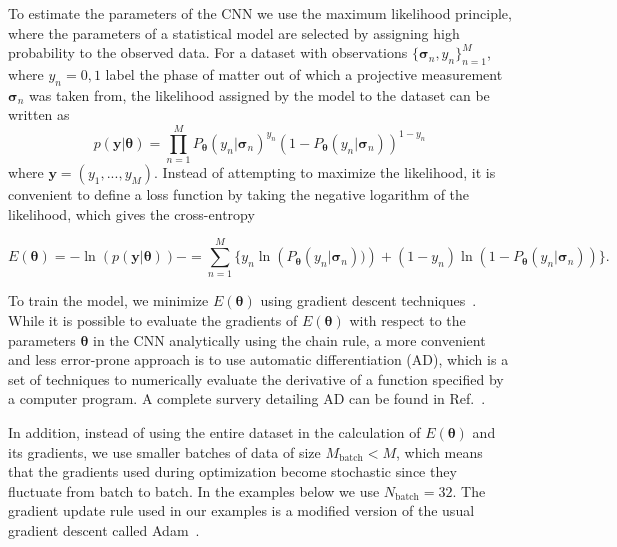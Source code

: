 \documentclass[twocolumn,english,reprint,superscriptaddress,longbibliography,pra]{revtex4-1}
\begin{document}

To estimate the parameters of the CNN we use the maximum likelihood principle, where the parameters of a statistical model are selected by assigning high probability to the observed data. For a dataset with observations $\{\bm{\sigma}_n, y_n \}_{n=1}^{M}$, where $y_n=0,1$ label the phase of matter out of which a projective measurement $\bm{\sigma}_n$ was taken from, the likelihood assigned by the model to the dataset can be written as 
\begin{equation}
    p(\bm{y}|\bm{\theta}) = \prod_{n=1}^{M}
     P_{\bm{\theta}}(y_n|\bm{\sigma}_n)^{y_n}(1-P_{\bm{\theta}}(y_n|\bm{\sigma}_n))^{1-y_n}
\end{equation}
where $\bm{y}=(y_1,...,y_{M})$. Instead of attempting to maximize the likelihood, it is convenient to define a loss function by taking the negative logarithm of the likelihood, which gives the cross-entropy
\begin{widetext}
\begin{equation}
E(\bm{\theta}) = -\ln( p(\bm{y}|\bm{\theta})) - =  \sum_{n=1}^{M} \{ y_n \ln \left(P_{\bm{\theta}}(y_n|\bm{\sigma}_n))\right) + (1-y_n)\ln(1 - P_{\bm{\theta}}(y_n|\bm{\sigma}_n)) \}. 
\label{Eq::NLL}
\end{equation}
\end{widetext}

To train the model, we minimize $E(\bm{\theta})$ using gradient descent techniques~\cite{10.5555/1162264}. While it is possible to evaluate the gradients of $E(\bm{\theta})$ with respect to the parameters $\bm{\theta}$ in the CNN analytically using the chain rule, a more convenient and less error-prone approach is to use automatic differentiation (AD), which is a set of techniques to numerically evaluate the derivative of a function specified by a computer program. A complete survery detailing AD can be found in Ref.~\cite{AD_2017}. 

In addition, instead of using the entire dataset in the calculation of $E(\bm{\theta})$ and its gradients, we use smaller batches of data of size $M_{\text{batch}}<M$, which means that the gradients used during optimization become stochastic since they fluctuate from batch to batch. In the examples below we use $N_{\text{batch}}=32$. The gradient update rule used in our examples is a modified version of the usual gradient descent called Adam~\cite{2014arXiv1412.6980K}.  
\end{document}

